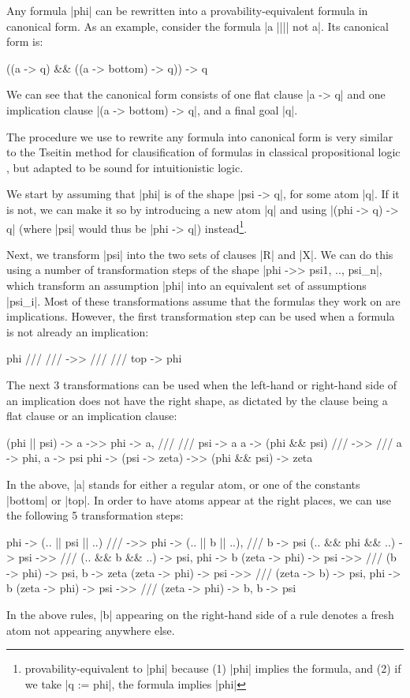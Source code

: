 \documentclass{llncs}
\begin{document}
Any formula |phi| can be rewritten into a provability-equivalent formula in canonical form. As an example, consider the formula
|a |||| not a|. Its canonical form is:
\begin{code}
((a -> q) && ((a -> bottom) -> q)) -> q
\end{code}
We can see that the canonical form consists of one flat clause |a -> q| and one implication clause |(a -> bottom) -> q|, and a final goal |q|.

The procedure we use to rewrite any formula into canonical form is very similar to the Tseitin method for clausification of formulas in classical propositional logic \cite{tseitin}, but adapted to be sound for intuitionistic logic.

We start by assuming that |phi| is of the shape |psi -> q|, for some atom |q|. If it is not, we can make it so by introducing a new atom |q| and using |(phi -> q) -> q| (where |psi| would thus be |phi -> q|) instead\footnote{provability-equivalent to |phi| because (1) |phi| implies the formula, and (2) if we take |q := phi|, the formula implies |phi|}.

Next, we transform |psi| into the two sets of clauses |R| and |X|. We can
do this using a number of transformation steps of the shape |phi ->> psi1, .., psi_n|, which transform an assumption |phi|
into an equivalent set of assumptions |psi_i|. Most of these transformations assume that the formulas they work on are implications. However, the first transformation step can be used
when a formula is not already an implication:
\begin{code}
                   phi /// /// ->> /// /// top -> phi
\end{code}
The next 3 transformations can be used when the left-hand or right-hand side of
an implication does not have the right shape, as dictated by the clause being a flat clause or an implication clause:
\begin{code}
(phi ||  psi)  ->  a                   ->>      phi -> a, /// ///  psi -> a
         a     ->  (phi && psi)   ///  ->> ///  a -> phi,          a -> psi
         phi   ->  (psi -> zeta)       ->>      (phi && psi) -> zeta
\end{code}
In the above, |a| stands for either a regular atom, or one of
the constants |bottom| or |top|. In order to have atoms appear at the right places, we can use the following 5 transformation steps:
\begin{code}
                   phi   ->  (.. || psi || ..)  ///  ->>                        phi   -> (.. || b || ..), ///  b -> psi
(.. &&  phi    &&  ..)   ->  psi                     ->> /// (.. &&  b &&  ..)        -> psi,                  phi -> b
        (zeta  ->  phi)  ->  psi                     ->> ///         (b     ->  phi)  -> psi,                  b -> zeta
        (zeta  ->  phi)  ->  psi                     ->> ///         (zeta  ->  b)    -> psi,                  phi -> b
        (zeta  ->  phi)  ->  psi                     ->> ///         (zeta  ->  phi)  -> b,                    b -> psi
\end{code}
In the above rules, |b| appearing on the right-hand side of a rule denotes a fresh atom not appearing anywhere else.
\end{document}
